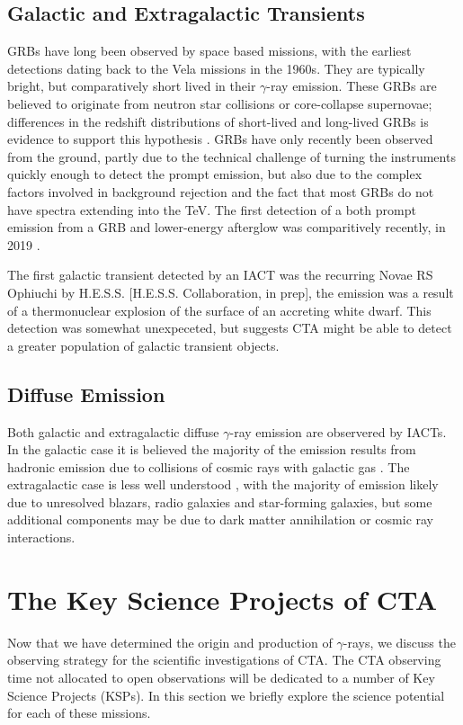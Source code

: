 \subsection{Galactic and Extragalactic Transients}
GRBs have long been observed by space based missions, with the earliest detections dating back to the Vela missions in the 1960s. They are typically bright, but comparatively short lived in their $\gamma$-ray emission. These GRBs are believed to originate from neutron star collisions or core-collapse supernovae; differences in the redshift distributions of short-lived and long-lived GRBs is evidence to support this hypothesis \cite{longair}.  GRBs have only recently been observed from the ground, partly due to the technical challenge of turning the instruments quickly enough to detect the prompt emission, but also due to the complex factors involved in background rejection and the fact that most GRBs do not have spectra extending into the TeV. The first detection of a both prompt emission from a GRB and lower-energy afterglow was comparitively recently, in 2019 \cite{magicGRB}.

The first galactic transient detected by an IACT was the recurring Novae RS Ophiuchi by H.E.S.S. [H.E.S.S. Collaboration, in prep], the emission was a result of a thermonuclear explosion of the surface of an accreting white dwarf. This detection was somewhat unexpeceted, but suggests CTA might be able to detect a greater population of galactic transient objects.

\subsection{Diffuse Emission}
Both galactic and extragalactic diffuse $\gamma$-ray emission are observered by IACTs. In the galactic case it is believed the majority of the emission results from hadronic emission due to collisions of cosmic rays with galactic gas \cite{extragamma}. The extragalactic case is less well understood \cite{extragamma}, with the majority of emission likely due to unresolved blazars, radio galaxies and star-forming galaxies, but some additional components may be due to dark matter annihilation or cosmic ray interactions.
\section{The Key Science Projects of CTA}
Now that we have determined the origin and production of $\gamma$-rays, we discuss the observing strategy for the scientific investigations of CTA. The CTA observing time not allocated to open observations will be dedicated to a number of Key Science Projects (KSPs). In this section we briefly explore the science potential for each of these missions.

